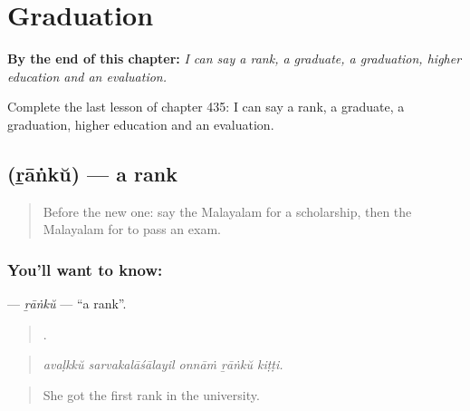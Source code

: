 
\chapter{Graduation}
\label{ch:ml-graduation}

\begin{chapteropening}
\textbf{By the end of this chapter:} \emph{I can say a rank, a graduate, a graduation, higher education and an evaluation.}

Complete the last lesson of chapter 435: I can say a rank, a graduate, a graduation, higher education and an evaluation.
\end{chapteropening}

\section[\texorpdfstring{\ml{റാങ്ക്} (ṟāṅkŭ)}{റാങ്ക് (ṟāṅkŭ)}]{ (ṟāṅkŭ) — a rank}

\label{lesson:ML-C435-ranku}



\begin{quote}
Before the new one: say the Malayalam for a scholarship, then the Malayalam for to pass an exam.
\end{quote}

\subsection*{You'll want to know: }
\textbf{} — \emph{ṟāṅkŭ} — \textquotedblleft{}a rank\textquotedblright{}.

\begin{quote}
    .
\end{quote}

\begin{quote}
\emph{avaḷkkŭ sarvakalāśālayil onnāṁ ṟāṅkŭ kiṭṭi.}
\end{quote}

\begin{quote}
She got the first rank in the university.
\end{quote}

